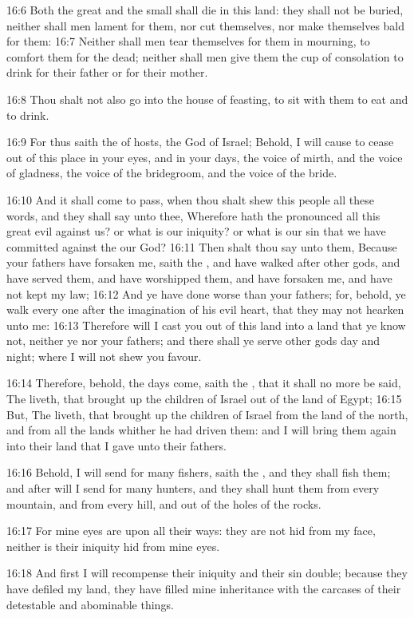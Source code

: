 16:6 Both the great and the small shall die in this land: they shall not be buried, neither shall men lament for them, nor cut themselves, nor make themselves bald for them: 16:7 Neither shall men tear themselves for them in mourning, to comfort them for the dead; neither shall men give them the cup of consolation to drink for their father or for their mother.

16:8 Thou shalt not also go into the house of feasting, to sit with them to eat and to drink.

16:9 For thus saith the \LORD of hosts, the God of Israel; Behold, I will cause to cease out of this place in your eyes, and in your days, the voice of mirth, and the voice of gladness, the voice of the bridegroom, and the voice of the bride.

16:10 And it shall come to pass, when thou shalt shew this people all these words, and they shall say unto thee, Wherefore hath the \LORD pronounced all this great evil against us? or what is our iniquity? or what is our sin that we have committed against the \LORD our God?  16:11 Then shalt thou say unto them, Because your fathers have forsaken me, saith the \LORD, and have walked after other gods, and have served them, and have worshipped them, and have forsaken me, and have not kept my law; 16:12 And ye have done worse than your fathers; for, behold, ye walk every one after the imagination of his evil heart, that they may not hearken unto me: 16:13 Therefore will I cast you out of this land into a land that ye know not, neither ye nor your fathers; and there shall ye serve other gods day and night; where I will not shew you favour.

16:14 Therefore, behold, the days come, saith the \LORD, that it shall no more be said, The \LORD liveth, that brought up the children of Israel out of the land of Egypt; 16:15 But, The \LORD liveth, that brought up the children of Israel from the land of the north, and from all the lands whither he had driven them: and I will bring them again into their land that I gave unto their fathers.

16:16 Behold, I will send for many fishers, saith the \LORD, and they shall fish them; and after will I send for many hunters, and they shall hunt them from every mountain, and from every hill, and out of the holes of the rocks.

16:17 For mine eyes are upon all their ways: they are not hid from my face, neither is their iniquity hid from mine eyes.

16:18 And first I will recompense their iniquity and their sin double; because they have defiled my land, they have filled mine inheritance with the carcases of their detestable and abominable things.


